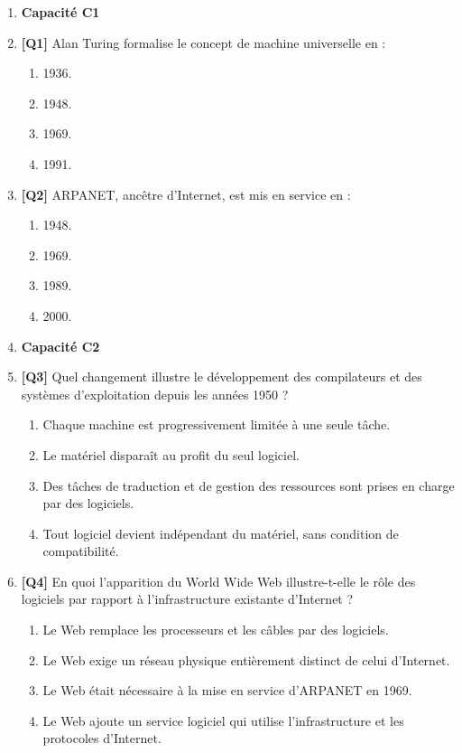 \begin{enumerate}

\item[] \textbf{Capacité C1}

\item \textbf{[Q1]} Alan Turing formalise le concept de machine universelle en :
  \begin{enumerate}[label=\Alph*.]
    \item 1936.
    \item 1948.
    \item 1969.
    \item 1991.
  \end{enumerate}

\item \textbf{[Q2]} ARPANET, ancêtre d'Internet, est mis en service en :
  \begin{enumerate}[label=\Alph*.]
    \item 1948.
    \item 1969.
    \item 1989.
    \item 2000.
  \end{enumerate}

\item[] \textbf{Capacité C2}

\item \textbf{[Q3]} Quel changement illustre le développement des compilateurs et des systèmes d'exploitation depuis les années 1950 ?
  \begin{enumerate}[label=\Alph*.]
    \item Chaque machine est progressivement limitée à une seule tâche.
    \item Le matériel disparaît au profit du seul logiciel.
    \item Des tâches de traduction et de gestion des ressources sont prises en charge par des logiciels.
    \item Tout logiciel devient indépendant du matériel, sans condition de compatibilité.
  \end{enumerate}

\item \textbf{[Q4]} En quoi l'apparition du World Wide Web illustre-t-elle le rôle des logiciels par rapport à l'infrastructure existante d'Internet ?
  \begin{enumerate}[label=\Alph*.]
    \item Le Web remplace les processeurs et les câbles par des logiciels.
    \item Le Web exige un réseau physique entièrement distinct de celui d'Internet.
    \item Le Web était nécessaire à la mise en service d'ARPANET en 1969.
    \item Le Web ajoute un service logiciel qui utilise l'infrastructure et les protocoles d'Internet.
  \end{enumerate}

\end{enumerate}

